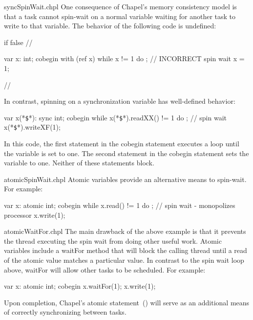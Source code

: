 \begin{chapelexample}{syncSpinWait.chpl}
One consequence of Chapel's memory consistency model is that a task cannot spin-wait on a
normal variable waiting for another task to write to that variable.  The behavior of
the following code is undefined:

\begin{chapelpre}
if false { // }
\end{chapelpre}
\begin{chapel}
var x: int;
cobegin with (ref x) {
  while x != 1 do ;  // INCORRECT spin wait
  x = 1;
}
\end{chapel}
\begin{chapelnoprint}
// {
}
\end{chapelnoprint}
In contrast, spinning on a synchronization variable has well-defined
behavior:
\begin{chapel}
var x(*\texttt{\$}*): sync int;
cobegin {
  while x(*\texttt{\$}*).readXX() != 1 do ;  // spin wait
  x(*\texttt{\$}*).writeXF(1);
}
\end{chapel}

In this code, the first statement in the cobegin statement executes a
loop until the variable is set to one.  The second statement in the
cobegin statement sets the variable to one.  Neither of these
statements block.
\end{chapelexample}

\begin{chapelexample}{atomicSpinWait.chpl}
Atomic variables provide an alternative means to spin-wait.
For example:

\begin{chapel}
var x: atomic int;
cobegin {
  while x.read() != 1 do ;  // spin wait - monopolizes processor
  x.write(1);
}
\end{chapel}

\end{chapelexample}


\begin{chapelexample}{atomicWaitFor.chpl}
The main drawback of the above example is that it prevents the thread
executing the spin wait from doing other useful work. Atomic variables
include a waitFor method that will block the calling thread until a read
of the atomic value matches a particular value. In contrast to the spin
wait loop above, waitFor will allow other tasks to be scheduled. For
example:

\begin{chapel}
var x: atomic int;
cobegin {
  x.waitFor(1);
  x.write(1);
}
\end{chapel}

\end{chapelexample}


\begin{future}
Upon completion, Chapel's atomic statement~() will serve as
an additional means of correctly synchronizing between tasks.
\end{future}

